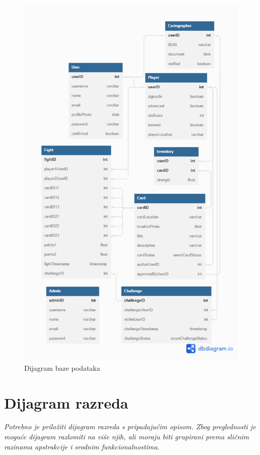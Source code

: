 				\begin{figure}[H]
        			\includegraphics[scale=0.4]{slike/ERdiagram.png}
        			\centering
        			\caption{Dijagram baze podataka}
        			\label{fig:promjene}
        		\end{figure}
			
			\eject
			
			
		\section{Dijagram razreda}
		
			\textit{Potrebno je priložiti dijagram razreda s pripadajućim opisom. Zbog preglednosti je moguće dijagram razlomiti na više njih, ali moraju biti grupirani prema sličnim razinama apstrakcije i srodnim funkcionalnostima.}\\
			

